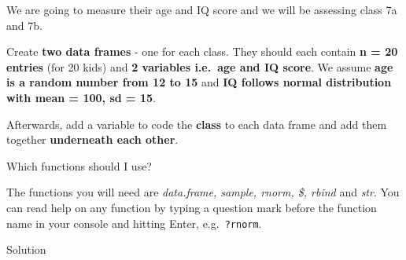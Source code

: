 \documentclass[
]{book}
\begin{document}
We are going to measure their age and IQ score and we will be assessing class 7a and 7b.

Create \textbf{two data frames} - one for each class.
They should each contain \textbf{n = 20 entries} (for 20 kids) and \textbf{2 variables i.e.~age and IQ score}.
We assume \textbf{age is a random number from 12 to 15} and \textbf{IQ follows normal distribution with mean = 100, sd = 15}.

Afterwards, add a variable to code the \textbf{class} to each data frame and add them together \textbf{underneath each other}.

Which functions should I use?

The functions you will need are \emph{data.frame, sample, rnorm, \$, rbind} and \emph{str}.
You can read help on any function by typing a question mark before the function name in your console and hitting Enter, e.g.~\texttt{?rnorm}.

Solution
\end{document}
